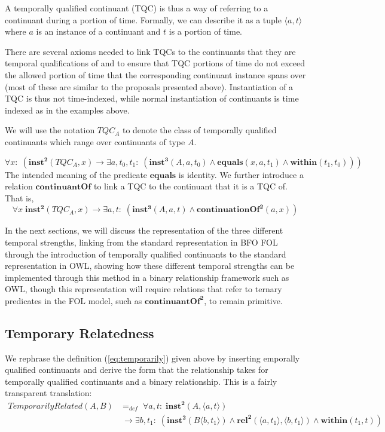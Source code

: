 \documentclass{ao2e}
\newcommand{\mirel}[1]{\ensuremath{\mathrm{\mathbf{#1}}}}
\newcommand{\mclass}[1]{\ensuremath{\mathit{#1}}}
\newcommand{\mrel}[2]{\mirel{#1^#2}}
\newcommand{\mrelb}[1]{\mrel{#1}{2}}
\newcommand{\mrelt}[1]{\mrel{#1}{3}}
\newcommand{\pair}[2]{\ensuremath{\langle #1,#2\rangle}}
\newcommand{\TQC}[1]{\ensuremath{TQC_{\mclass{#1}}}}
\begin{document}
A temporally qualified continuant (TQC) is thus a way of referring to a continuant
during a portion of time. Formally, we can describe it as a tuple \pair{a}{t}
where $a$ is an instance
of a continuant and $t$ is a portion of time. 

There are several axioms needed to link TQCs to the continuants that they are
temporal qualifications of and to ensure that TQC portions of time do not exceed the
allowed portion of time that the corresponding continuant instance spans over
(most of these are similar to the proposals presented above).
Instantiation of a TQC is thus not time-indexed, while normal instantiation of
continuants is time indexed as in the examples above. 


We will use the notation \TQC{A} to denote the class of temporally qualified
continuants which range over continuants of type \mclass{A}.

\begin{equation}
\forall x:\; (\mrelb{inst}(\TQC{A},x) \rightarrow \exists a,t_0,t_1:\;(
\mrelt{inst}(\mclass{A},a,t_0) \wedge \mirel{equals}(x,a,t_1) \wedge
\mirel{within}(t_1,t_0)))
\end{equation}
The intended meaning of the predicate \mirel{equals} is identity.  
We further introduce a relation \mirel{continuantOf} to link a TQC to the continuant
that it is a TQC of. That is, 
\begin{equation}
\forall x\; \mrelb{inst}(\TQC{A},x) \rightarrow \exists a,t:\;(
\mrelt{inst}(\mclass{A}, a,t) \wedge \mrelb{continuationOf}(a,x))
\end{equation}

In the next sections, we will discuss the representation of the three different
temporal strengths, linking from the standard representation in BFO FOL through
the introduction of temporally qualified continuants to the standard
representation in OWL, showing how these different temporal strengths can be
implemented through this method in a binary relationship framework such as OWL,
though this representation will require relations that refer to ternary
predicates in the FOL model, such as \mrelb{continuantOf}, to remain primitive.
\subsection{Temporary Relatedness}

We rephrase the definition (\ref{eq:temporarily}) given above by inserting
emporally qualified continuants and derive the form that the relationship takes
for temporally qualified continuants and a binary relationship. This is a fairly
transparent translation:
\begin{equation}
\begin{split}
\mclass{TemporarilyRelated}(\mclass{A},\mclass{B})& =_{def}\;
\forall a, t:\; \mrelb{inst}(\mclass{A}, \pair{a}{t}) \\
&\ \rightarrow
\exists b, t_1:\;(\mrelb{inst}(\mclass{B}\pair{b}{t_1}) \wedge
\mrelb{rel}(\pair{a}{t_1},\pair{b}{t_1}) \wedge \mirel{within}(t_1,t))
\end{split}
\end{equation}
\end{document}
